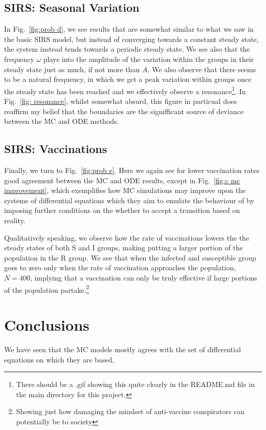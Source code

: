 \documentclass[10pt,showpacs,preprintnumbers,amsmath,amssymb,nofootinbib,aps,prl,twocolumn,groupedaddress,superscriptaddress,showkeys]{revtex4-1}
\begin{document}
  \subsection{SIRS: Seasonal Variation}
    In Fig.~\ref{fig:prob d}, we see results that are somewhat similar to what we saw in the basic SIRS model, but instead of converging towards a constant steady state, the system instead tends towards a periodic steady state. We see also that the frequency $\omega$ plays into the amplitude of the variation within the groups in their steady state just as much, if not more than $A$. We also observe that there seems to be a natural frequency, in which we get a peak variation within groups once the steady state has been reached and we effectively observe a resonance\footnote{There should be a .gif showing this quite clearly in the README.md file in the main directory for this project.}. 
    In Fig.~\ref{fig: resonance}, whilst somewhat absurd, this figure in particual does reaffirm my belief that the boundaries are the signifficant source of deviance between the MC and ODE methods.


  \subsection{SIRS: Vaccinations}
    Finally, we turn to Fig.~\ref{fig:prob e}. Here we again see for lower vaccination rates good agreement between the MC and ODE results, except in Fig.~\ref{fig:c mc improvement}, which exemplifies how MC simulations may improve upon the systems of differential equations which they aim to emulate the behaviour of by imposing further conditions on the whether to accept a transition based on reality.

    Qualitatively speaking, we observe how the rate of vaccinations lowers the the steady states of both S and I groups, making putting a larger portion of the  population in the R group. We see that when the infected and susceptible group goes to zero only when the  rate of vaccination approaches the population, $N=400$, implying that a vaccination can only be truly effective if large portions of the population partake.\footnote{Showing just how damaging the mindset of anti-vaccine conspirators can potentially be to society}

\section{Conclusions}

  We have seen that the MC models mostly agrees with the set of differential equations on which they are based, 
\end{document}
